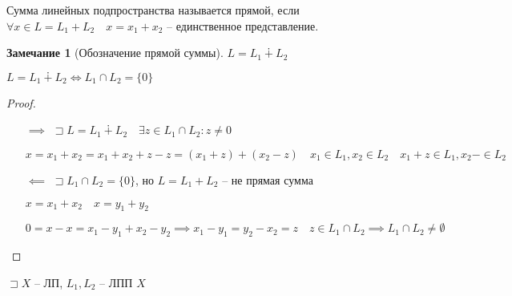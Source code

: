 \documentclass{book}
\renewcommand\O{\ensuremath{\emptyset}}
\theoremstyle{definition}
\newtheorem*{note}{Замечание}
\begin{document}
\begin{definition}
    Сумма линейных подпространства называется прямой, если $\forall x\in L = L_1+L_2\quad x = x_1+x_2$ -- единственное представление.
\end{definition}
\begin{note}
    [Обозначение прямой суммы]

    $L = L_1 \dotplus L_2$
\end{note}

\begin{lemma}
    $L = L_1\dotplus L_2 \iff  L_1\cap L_2 = \{0\}$
\end{lemma}
\begin{proof}
    \begin{itemize}
        \item []
        \item [$\implies $]$\sqsupset L = L_1\dotplus L_2\quad \exists z\in L_1\cap L_2:z\neq 0$

            $x = x_1+x_2 = x_1+x_2+z-z = (x_1+z) + (x_2-z)\quad x_1\in L_1, x_2\in L_2\quad x_1+z\in L_1, x_2-\in L_2$
        \item [$\impliedby $] $\sqsupset L_1\cap L_2 = \{0\}$, но $L = L_1 + L_2$ -- не прямая сумма

            $x = x_1+x_2\quad x = y_1+y_2$

            $0 = x-x = x_1-y_1+x_2-y_2 \implies x_1-y_1 = y_2-x_2 = z\quad z\in L_1\cap L_2 \implies  L_1\cap L_2\neq \O $
    \end{itemize}
\end{proof}

$\sqsupset X$ -- ЛП,  $L_1, L_2$ -- ЛПП $X$
\end{document}
